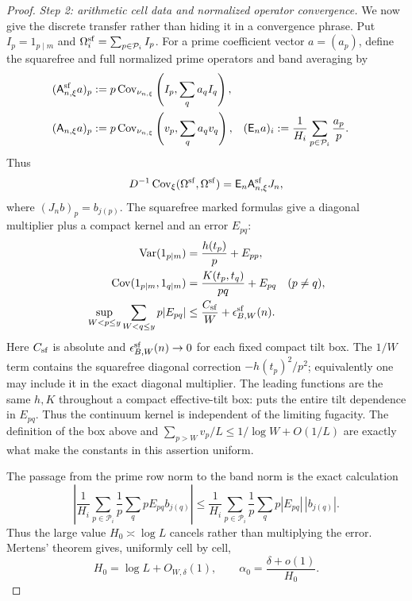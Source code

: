 \documentclass[11pt]{article}
\numberwithin{equation}{section}
\theoremstyle{definition}
\theoremstyle{remark}
\newcommand{\1}{\mathbf 1}
\begin{document}
\begin{proof}
\medskip\noindent
\emph{Step 2: arithmetic cell data and normalized operator
convergence.}\quad
We now give the discrete transfer rather than hiding it in a convergence
phrase.  Put \(I_p=1_{p\mid m}\) and
\(\Omega_i^{\rm sf}=\sum_{p\in\mathcal P_i}I_p\).  For a prime
coefficient vector \(a=(a_p)\), define the squarefree and full normalized
prime operators and band averaging by
\begin{align}
 (\mathsf A^{\rm sf}_{n,\xi}a)_p
   &:=p\operatorname{Cov}_{\nu_{n,\xi}}
       \left(I_p,\sum_q a_qI_q\right),\notag\\
 (\mathsf A_{n,\xi}a)_p
   &:=p\operatorname{Cov}_{\nu_{n,\xi}}
       \left(v_p,\sum_q a_qv_q\right),
 & (\mathsf E_na)_i&:=\frac1{H_i}
       \sum_{p\in\mathcal P_i}\frac{a_p}{p}.
 \label{eq:smooth-prime-band-operators}
\end{align}
Thus
\[
 D^{-1}\operatorname{Cov}_\xi(\Omega^{\rm sf},\Omega^{\rm sf})
 =\mathsf E_n\mathsf A^{\rm sf}_{n,\xi}J_n,
\]
where \((J_nb)_p=b_{j(p)}\).  The squarefree marked formulas give a diagonal
multiplier plus a compact kernel and an error \(E_{pq}\):
\begin{align}
 \operatorname{Var}(1_{p\mid m})
   &=\frac{h(t_p)}p+E_{pp},\notag\\
 \operatorname{Cov}(1_{p\mid m},1_{q\mid m})
   &=\frac{K(t_p,t_q)}{pq}+E_{pq}\quad(p\ne q),
 \label{eq:smooth-arithmetic-kernel}\\
 \sup_{W<p\le y}\sum_{W<q\le y}p|E_{pq}|
   &\le \frac{C_{\rm sf}}W+\epsilon^{\rm sf}_{B,W}(n).
 \label{eq:smooth-normalized-prime-row-error}
\end{align}
Here \(C_{\rm sf}\) is absolute and
\(\epsilon^{\rm sf}_{B,W}(n)\to0\) for each fixed compact tilt box.
The \(1/W\) term contains the squarefree diagonal correction
\(-h(t_p)^2/p^2\); equivalently one may include it in the exact diagonal
multiplier.  The leading functions are the same \(h,K\) throughout a compact
effective-tilt box:  puts the entire
tilt dependence in \(E_{pq}\).  Thus the continuum kernel is independent
of the limiting fugacity.  The definition of the box above
and \(\sum_{p>W}v_p/L\leq1/\log W+O(1/L)\) are exactly what make the
constants in this assertion uniform.

The passage from the prime row norm to the band norm is the exact
calculation
\begin{equation}
 \left|\frac1{H_i}\sum_{p\in\mathcal P_i}\frac1p
       \sum_qpE_{pq}b_{j(q)}\right|
 \leq\frac1{H_i}\sum_{p\in\mathcal P_i}\frac1p
       \sum_qp|E_{pq}|\,|b_{j(q)}|.
 \label{eq:smooth-band-normalized-row-transfer}
\end{equation}
Thus the large value \(H_0\asymp\log L\) cancels rather than multiplying
the error.  Mertens' theorem gives, uniformly cell by cell,
\begin{equation}
 H_0=\log L+O_{W,\delta}(1),\qquad
 \alpha_0=\frac{\delta+o(1)}{H_0}.
 \label{eq:smooth-discrete-low-asymptotics}
\end{equation}


\end{proof}
\end{document}
